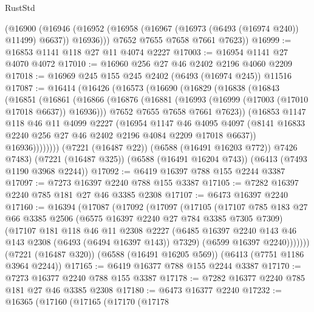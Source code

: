 \begin{lexlean}{RustStd}
\begin{coremodule}
        (@16900
          (@16946 (@16952 (@16958 (@16967 (@16973 (@6493 (@16974 @240)) @11499) @6637)) @16936)))
        @7652
        @7655
        @7658
        @7661
        @7623))
@16999 := @16853 @1141 @118 @27 @11 @4074 @2227
@17003 := @16954 @1141 @27 @4070 @4072
@17010 := @16960 @256 @27 @46 @2402 @2196 @4060 @2209
@17018 := @16969 @245 @155 @245 @2402 (@6493 (@16974 @245)) @11516
@17087 := @16414
    (@16426
      (@16573
        (@16690
          (@16829
            (@16838
              (@16843
                (@16851
                  (@16861
                    (@16866
                      (@16876
                        (@16881 (@16993 (@16999 (@17003 (@17010 @17018 @6637)) @16936)))
                        @7652
                        @7655
                        @7658
                        @7661
                        @7623))
                    (@16853
                      @1147
                      @118
                      @46
                      @11
                      @4099
                      @2227
                      (@16954
                        @1147
                        @46
                        @4095
                        @4097
                        (@8141 @16833 @2240 @256 @27 @46 @2402 @2196 @4084 @2209 @17018 @6637))
                      @16936))))))))
      (@7221 (@16487 @22))
      (@6588 (@16491 @16203 @772))
      @7426
      @7483)
    (@7221 (@16487 @325))
    (@6588 (@16491 @16204 @743))
    (@6413 (@7493 @1190 @3968 @2244))
@17092 := @6419 @16397 @788 @155 @2244 @3387
@17097 := @7273 @16397 @2240 @788 @155 @3387
@17105 := @7282 @16397 @2240 @785 @181 @27 @46 @3385 @2308
@17107 := @6473 @16397 @2240
@17160 := @16394
    (@17087
      (@17092
        (@17097
          (@17105
            (@17107
              @785
              @183
              @27
              @66
              @3385
              @2506
              (@6575 @16397 @2240 @27 @784 @3385 @7305 @7309)
              (@17107
                @181
                @118
                @46
                @11
                @2308
                @2227
                (@6485 @16397 @2240 @143 @46 @143 @2308 (@6493 (@6494 @16397 @143)) @7329)
                (@6599 @16397 @2240)))))))
    (@7221 (@16487 @320))
    (@6588 (@16491 @16205 @569))
    (@6413 (@7751 @1186 @3964 @2244))
@17165 := @6419 @16377 @788 @155 @2244 @3387
@17170 := @7273 @16377 @2240 @788 @155 @3387
@17178 := @7282 @16377 @2240 @785 @181 @27 @46 @3385 @2308
@17180 := @6473 @16377 @2240
@17232 := @16365
    (@17160
      (@17165
        (@17170
          (@17178

\end{coremodule}
\end{lexlean}
